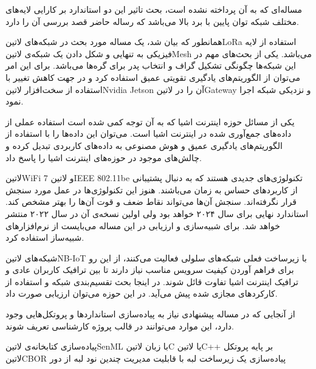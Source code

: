 مساله‌ای که به آن پرداخته نشده است، بحث تاثیر این دو استاندارد بر کارایی لایه‌های مختلف شبکه توان پایین با برد بالا می‌باشد که رساله حاضر قصد بررسی آن را دارد.


همانطور که بیان شد، یک مساله مورد بحث در شبکه‌های ‌لاتین{LoRa} استفاده از لایه فیزیکی به تنهایی و شکل دادن یک شبکه‌ی ‌لاتین{Mesh} می‌باشد.
یکی از بحث‌های مهم در این شبکه‌ها چگونگی تشکیل گراف و انتخاب پدر برای گره‌ها می‌باشد. برای این امر می‌توان از الگوریتم‌های یادگیری تقویتی عمیق استفاده کرد
و در جهت کاهش تغییر با استفاده از سخت‌افزار ‌لاتین{Nvidia Jetson} آن را در ‌لاتین{Gateway} و نزدیکی شبکه اجرا نمود.


یکی از مسائل حوزه اینترنت اشیا که به آن توجه کمی شده است استفاده عملی از داده‌های جمع‌آوری شده در اینترنت اشیا است. می‌توان این داده‌ها را با استفاده از الگوریتم‌های یادگیری عمیق و هوش مصنوعی به داده‌های کاربردی تبدیل کرده
و چالش‌های موجود در حوزه‌های اینترنت اشیا را پاسخ داد.


‌لاتین{WiFi 7} و ‌لاتین{IEEE 802.11be} تکنولوژی‌های جدیدی هستند که به دنبال پشتیبانی از کاربردهای حساس به زمان می‌باشند. هنوز این تکنولوژی‌ها در عمل مورد سنجش قرار نگرفته‌اند.
سنجش آن‌ها می‌تواند نقاط ضعف و قوت آن‌ها را بهتر مشخص کند. استاندارد نهایی برای سال ۲۰۲۴ خواهد بود ولی اولین نسخه‌ی آن در سال ۲۰۲۲ منتشر خواهد شد. برای شبیه‌سازی و ارزیابی در این
مساله می‌بایست از نرم‌افزارهای شبیه‌ساز استفاده کرد.


شبکه‌های ‌لاتین{NB-IoT} با زیرساخت فعلی شبکه‌های سلولی فعالیت می‌کنند، از این رو برای فراهم آوردن کیفیت سرویس مناسب نیاز دارند تا بین ترافیک کاربران عادی
و ترافیک اینترنت اشیا تفاوت قائل شوند. در اینجا بحث تقسیم‌بندی شبکه و استفاده از کارکردهای مجازی شده پیش می‌آید.
در این حوزه می‌توان ارزیابی صورت داد.


از آنجایی که در مساله پیشنهادی نیاز به پیاده‌سازی استانداردها و پروتکل‌هایی وجود دارد، این موارد می‌توانند در قالب پروژه کارشناسی تعریف شوند.

 پیاده‌سازی کتابخانه‌ی ‌لاتین{SenML} با زبان ‌لاتین{C} یا ‌لاتین{C++} بر پایه پروتکل ‌لاتین{CBOR}
 پیاده‌سازی یک زیرساخت لبه با قابلیت مدیریت چندین نود لبه از دور
